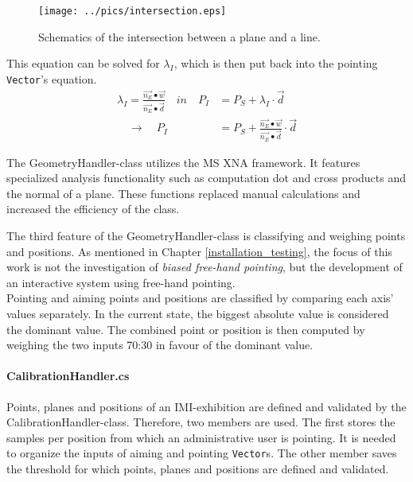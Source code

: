 \begin{figure}[H]%
\texttt{[image: ../pics/intersection.eps]}%
\caption{Schematics of the intersection between a plane and a line.}%
\label{fig:vector_plane_intersect} 
\end{figure}

This equation can be solved for $\lambda_{I}$, which is then put back into the pointing \texttt{Vector}'s equation.
\begin{align*}
	\lambda_{I} = \frac{\overrightarrow{n_{E}} \bullet \overrightarrow{w}}{\overrightarrow{n_{E}} \bullet \overrightarrow{d}} \quad in \quad P_{I} &= P_{S} + \lambda_{I} \cdot \overrightarrow{d} \\	
	\quad \to \quad P_{I} &= P_{S} + \frac{\overrightarrow{n_{E}} \bullet \overrightarrow{w}}{\overrightarrow{n_{E}} \bullet \overrightarrow{d}} \cdot \overrightarrow{d}
\end{align*}

The GeometryHandler-class utilizes the \ac{MS} XNA framework. It features specialized analysis functionality such as computation dot and cross products and the normal of a plane. These functions replaced manual calculations and increased the efficiency of the class.

The third feature of the GeometryHandler-class is classifying and weighing points and positions. As mentioned in Chapter \ref{installation_testing}, the focus of this work is not the investigation of \textit{biased free-hand pointing}, but the development of an interactive system using free-hand pointing.
\\
Pointing and aiming points and positions are classified by comparing each axis' values separately. In the current state, the biggest absolute value is considered the dominant value. The combined point or position is then computed by weighing the two inputs 70:30 in favour of the dominant value.


\paragraph{CalibrationHandler.cs} Points, planes and positions of an \ac{IMI}-exhibition are defined and validated by the CalibrationHandler-class. Therefore, two members are used. The first stores the samples per position from which an administrative user is pointing. It is needed to organize the inputs of aiming and pointing \texttt{Vector}s. The other member saves the threshold for which points, planes and positions are defined and validated.


